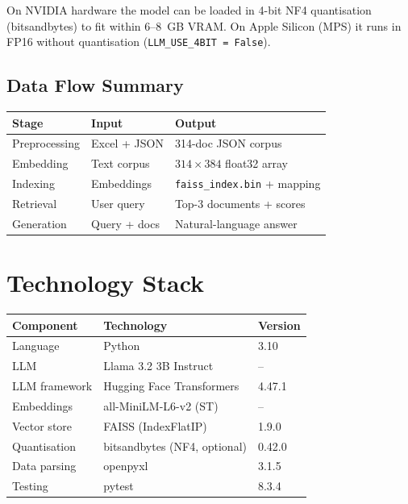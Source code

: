 \documentclass[12pt,a4paper]{article}
\begin{document}
On NVIDIA hardware the model can be loaded in 4-bit NF4 quantisation
(bitsandbytes) to fit within 6--8~GB VRAM.  On Apple Silicon (MPS) it runs in
FP16 without quantisation (\texttt{LLM\_USE\_4BIT = False}).

\subsection{Data Flow Summary}

\begin{center}
\begin{tabular}{lll}
  \toprule
  Stage & Input & Output \\
  \midrule
  Preprocessing  & Excel + JSON   & 314-doc JSON corpus \\
  Embedding      & Text corpus    & $314 \times 384$ float32 array \\
  Indexing       & Embeddings     & \texttt{faiss\_index.bin} + mapping \\
  Retrieval      & User query     & Top-3 documents + scores \\
  Generation     & Query + docs   & Natural-language answer \\
  \bottomrule
\end{tabular}
\end{center}

\section{Technology Stack}

\begin{center}
\begin{tabular}{lll}
  \toprule
  Component        & Technology                  & Version \\
  \midrule
  Language         & Python                      & 3.10    \\
  LLM              & Llama 3.2 3B Instruct       & --      \\
  LLM framework    & Hugging Face Transformers   & 4.47.1  \\
  Embeddings       & all-MiniLM-L6-v2 (ST)       & --      \\
  Vector store     & FAISS (IndexFlatIP)         & 1.9.0   \\
  Quantisation     & bitsandbytes (NF4, optional) & 0.42.0  \\
  Data parsing     & openpyxl                    & 3.1.5   \\
  Testing          & pytest                      & 8.3.4   \\
  \bottomrule
\end{tabular}
\end{center}
\end{document}
